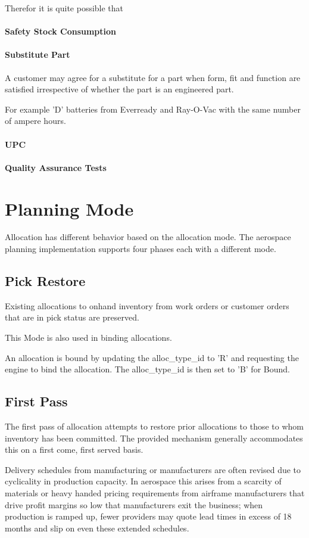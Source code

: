 Therefor it is quite possible that 

\paragraph{Safety Stock Consumption}

\paragraph{Substitute Part}
A customer may agree for a substitute for a part when form, fit and function are satisfied irrespective 
of whether the part is an engineered part.

For example 'D' batteries from Everready and Ray-O-Vac with the same number of ampere hours.
\paragraph{UPC}
\paragraph{Quality Assurance Tests}
\section{Planning Mode}
Allocation has different behavior based on the allocation mode.  The aerospace
planning implementation supports 
four phases each with a different mode.

\subsection{Pick Restore}
Existing allocations to onhand inventory from work orders or customer orders
that are in pick status are preserved.

This Mode is also used in binding allocations.

An allocation is bound by updating the alloc\_type\_id to 'R' and requesting the
engine to bind the allocation.  
The alloc\_type\_id is then set to 'B' for Bound.
\subsection{First Pass}
The first pass of allocation attempts to restore prior allocations to those to whom inventory
has been committed.  The provided mechanism generally accommodates this on a first come, first served basis.

Delivery schedules from manufacturing or manufacturers are often revised due to cyclicality in production 
capacity.  In aerospace this arises from a scarcity of materials or heavy handed pricing requirements 
from airframe manufacturers that drive profit margins so low that manufacturers exit the business; when 
production is ramped up, fewer providers may quote lead times in excess of 18 months and slip on even
these extended schedules.

